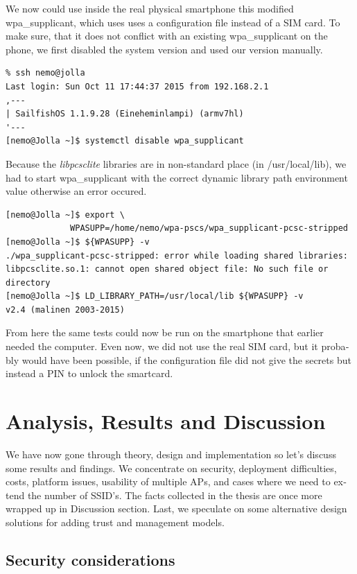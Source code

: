 \documentclass[12pt,a4paper,english]{tutthesis}
\begin{document}
\begin{otherlanguage}{english}
We now could use inside the real physical smartphone this modified
wpa\_supplicant, which uses uses a configuration file instead of a SIM card.  To make
sure, that it does not conflict with an existing wpa\_supplicant on the phone,
we first disabled the system version and used our version manually.

\begin{verbatim}
% ssh nemo@jolla
Last login: Sun Oct 11 17:44:37 2015 from 192.168.2.1
,---
| SailfishOS 1.1.9.28 (Eineheminlampi) (armv7hl)
'---
[nemo@Jolla ~]$ systemctl disable wpa_supplicant
\end{verbatim}

Because the \emph{libpcsclite} libraries are in non-standard
place (in /usr/local/lib), we had to start wpa\_supplicant with the correct
dynamic library path environment value otherwise an error occured.


\begin{verbatim}
[nemo@Jolla ~]$ export \
             WPASUPP=/home/nemo/wpa-pscs/wpa_supplicant-pcsc-stripped
[nemo@Jolla ~]$ ${WPASUPP} -v
./wpa_supplicant-pcsc-stripped: error while loading shared libraries:
libpcsclite.so.1: cannot open shared object file: No such file or 
directory
[nemo@Jolla ~]$ LD_LIBRARY_PATH=/usr/local/lib ${WPASUPP} -v
v2.4 (malinen 2003-2015)
\end{verbatim}
From here the same tests could now be run on the smartphone that
earlier needed the computer. Even now, we did not use the real SIM card, but it
probably would have been possible, if the configuration file did not give
the secrets but instead a PIN to unlock the smartcard.

\chapter{Analysis, Results and Discussion}
\label{sec-6}

We have now gone through theory, design and implementation so let's
discuss some results and findings. We concentrate on security, 
deployment difficulties, costs, platform issues, usability of multiple
APs, and cases where we
need to extend the number of SSID's. The facts collected in the thesis
are once more wrapped up in Discussion section.
Last, we speculate on some alternative design solutions for adding
trust and management models.


\section{Security considerations}
\label{sec-6-1}




\end{otherlanguage}
\end{document}
